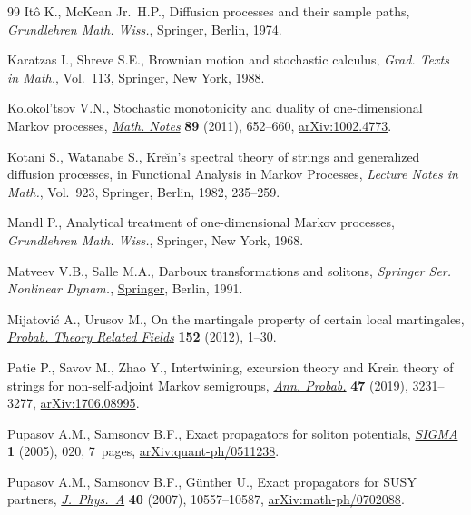 \begin{thebibliography}{99}
It\^o K., McKean Jr.~H.P., Diffusion processes and their sample paths,
 \textit{Grundlehren Math. Wiss.}, Springer, Berlin, 1974.

Karatzas I., Shreve S.E., Brownian motion and stochastic calculus,
 \textit{Grad. Texts in Math.}, Vol.~113,
 \href{https://doi.org/10.1007/978-1-4684-0302-2}{Springer}, New York, 1988.

Kolokol'tsov V.N., Stochastic monotonicity and duality of one-dimensional
 {M}arkov processes,
 \href{https://doi.org/10.1134/S0001434611050063}{\textit{Math. Notes}}
 \textbf{89} (2011), 652--660,
 \href{http://arxiv.org/abs/1002.4773}{arXiv:1002.4773}.

Kotani S., Watanabe S., Kre\u{\i}n's spectral theory of strings and generalized
 diffusion processes, in Functional {A}nalysis in {M}arkov {P}rocesses,
 \textit{Lecture Notes in Math.}, Vol.~923, Springer, Berlin, 1982, 235--259.

Mandl P., Analytical treatment of one-dimensional {M}arkov processes,
 \textit{Grundlehren Math. Wiss.}, Springer, New York, 1968.

Matveev V.B., Salle M.A., Darboux transformations and solitons, \textit{Springer Ser. Nonlinear Dynam.}, \href{https://doi.org/10.1007/978-3-662-00922-2}{Springer},
 Berlin, 1991.

Mijatovi\'c A., Urusov M., On the martingale property of certain local
 martingales, \href{https://doi.org/10.1007/s00440-010-0314-7}{\textit{Probab.
 Theory Related Fields}} \textbf{152} (2012), 1--30.

Patie P., Savov M., Zhao Y., Intertwining, excursion theory and {K}rein theory
 of strings for non-self-adjoint {M}arkov semigroups,
 \href{https://doi.org/10.1214/19-AOP1338}{\textit{Ann. Probab.}} \textbf{47}
 (2019), 3231--3277, \href{http://arxiv.org/abs/1706.08995}{arXiv:1706.08995}.

Pupasov A.M., Samsonov B.F., Exact propagators for soliton potentials,
 \href{https://doi.org/10.3842/SIGMA.2005.020}{\textit{SIGMA}} \textbf{1}
 (2005), 020, 7~pages,
 \href{http://arxiv.org/abs/quant-ph/0511238}{arXiv:quant-ph/0511238}.

Pupasov A.M., Samsonov B.F., G\"unther U., Exact propagators for {SUSY}
 partners,
 \href{https://doi.org/10.1088/1751-8113/40/34/013}{\textit{J.~Phys.~A}}
 \textbf{40} (2007), 10557--10587,
 \href{http://arxiv.org/abs/math-ph/0702088}{arXiv:math-ph/0702088}.


\end{thebibliography}
